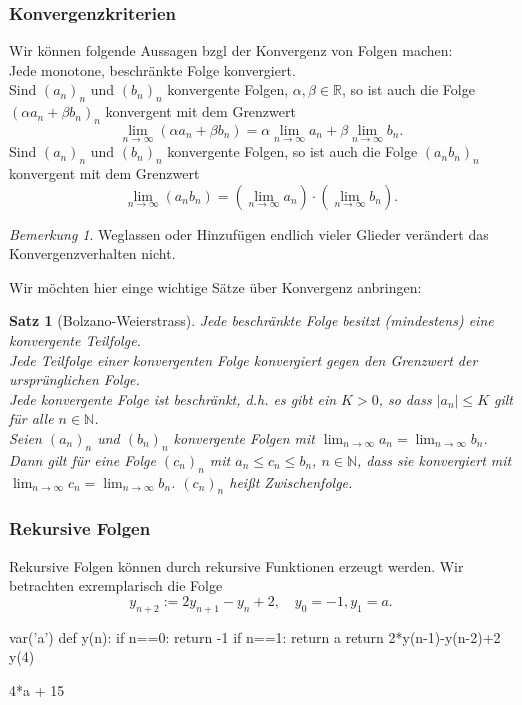 \documentclass[fontsize=12pt,paper=a4,twoside,bibtotoc,idxtotoc,
liststotoc,pagesize,BCOR1.2cm,DIV15,chapterprefix,pagesize=pdftex]{scrbook}
\theoremstyle{plain}
\newtheorem{sz}[equation]{Satz}
\theoremstyle{definition}
\theoremstyle{remark}
\newtheorem{bem}[equation]{Bemerkung}
\begin{document}
\subsubsection{Konvergenzkriterien}
Wir können folgende Aussagen bzgl der Konvergenz von Folgen machen:\\
Jede monotone, beschränkte Folge konvergiert.\\
Sind $(a_n)_n$ und $(b_n)_n$ konvergente Folgen, $\alpha, \beta \in \mathbb{R}$, so ist auch die
                   Folge $( \alpha a_n+\beta b_n)_n$ konvergent mit
                   dem Grenzwert
 \[ \lim_{n \rightarrow \infty} ( \alpha a_n + \beta b_n)= \alpha
                   \lim_{n \rightarrow \infty} a_n + \beta \lim_{n
                   \rightarrow \infty} b_n .\]
Sind $(a_n)_n$ und $(b_n)_n$ konvergente Folgen, so ist auch die
                   Folge $(a_n b_n)_n$ konvergent mit
                   dem Grenzwert
 \[
  \lim_{n \rightarrow \infty} ( a_n b_n)= 
                   (\lim_{n \rightarrow \infty} a_n) \cdot  (\lim_{n
                   \rightarrow \infty} b_n).
 \]
\begin{bem}
  Weglassen oder Hinzufügen endlich vieler Glieder verändert das
                   Konvergenzverhalten nicht.
\end{bem}
Wir möchten hier einge wichtige Sätze über Konvergenz anbringen:
\begin{sz}[Bolzano-Weierstrass]
Jede beschränkte Folge besitzt (mindestens) eine
konvergente Teilfolge.\\
 Jede Teilfolge einer konvergenten Folge konvergiert gegen den
Grenzwert der ursprünglichen Folge.\\
 Jede konvergente Folge ist beschränkt, d.h. es gibt ein $K>0$,
so dass $|a_n|\leq K$ gilt für alle $n \in \mathbb{N}$.\\
Seien $(a_n)_n$ und $(b_n)_n$ konvergente Folgen mit $\lim_{n
\rightarrow \infty} a_n = \lim_{n \rightarrow \infty} b_n$. Dann gilt
für eine Folge $(c_n)_n$ mit $a_n \leq c_n \leq b_n$, $n \in
\mathbb{N}$, dass sie konvergiert mit  $\lim_{n
\rightarrow \infty} c_n = \lim_{n \rightarrow \infty} b_n$. $(c_n)_n$ heißt Zwischenfolge.
\end{sz}
\subsubsection{Rekursive Folgen}
Rekursive Folgen können durch rekursive Funktionen erzeugt werden.
Wir betrachten exremplarisch die Folge 
\[ y_{n+2}:=2y_{n+1}-y_n+2, \quad y_0=-1, y_1=a. \]
\begin{sagein}
var('a')
def y(n):
   if n==0:
       return -1
   if n==1:
       return a
   return 2*y(n-1)-y(n-2)+2
y(4)
\end{sagein}
\begin{sage}
4*a + 15
\end{sage}
\end{document}
